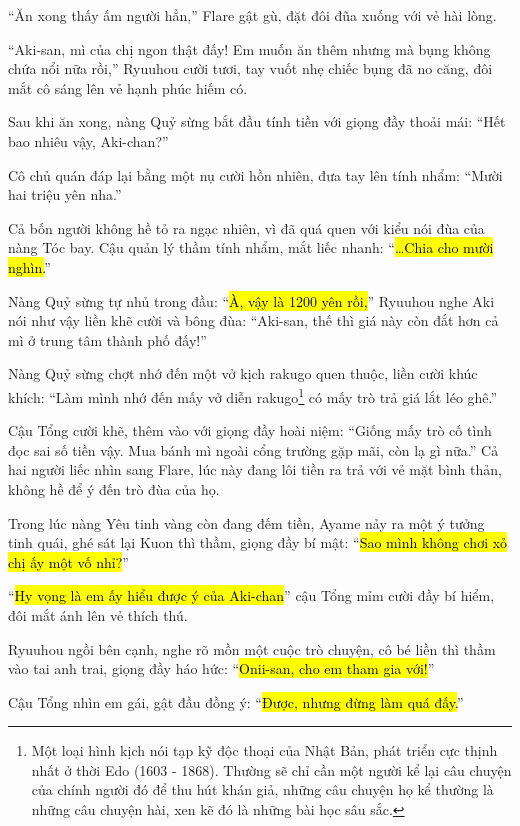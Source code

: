 \documentclass[../main.tex]{subfiles}
\begin{document}
``Ăn xong thấy ấm người hẳn,'' Flare gật gù, đặt đôi đũa xuống với vẻ hài lòng.

``Aki-san, mì của chị ngon thật đấy! Em muốn ăn thêm nhưng mà bụng không chứa nổi nữa rồi,'' Ryuuhou cười tươi, tay vuốt nhẹ chiếc bụng đã no căng, đôi mắt cô sáng lên vẻ hạnh phúc hiếm có.

Sau khi ăn xong, nàng Quỷ sừng bắt đầu tính tiền với giọng đầy thoải mái: ``Hết bao nhiêu vậy, Aki-chan?''

Cô chủ quán đáp lại bằng một nụ cười hồn nhiên, đưa tay lên tính nhẩm: ``Mười hai triệu yên nha.''


Cả bốn người không hề tỏ ra ngạc nhiên, vì đã quá quen với kiểu nói đùa của nàng Tóc bay. Cậu quản lý thầm tính nhẩm, mắt liếc nhanh: ``\hl{\dots Chia cho mười nghìn.}''

Nàng Quỷ sừng tự nhủ trong đầu: ``\hl{À, vậy là 1200 yên rồi,}'' Ryuuhou nghe Aki nói như vậy liền khẽ cười và bông đùa: ``Aki-san, thế thì giá này còn đắt hơn cả mì ở trung tâm thành phố đấy!''

Nàng Quỷ sừng chợt nhớ đến một vở kịch rakugo quen thuộc, liền cười khúc khích: ``Làm mình nhớ đến mấy vở diễn rakugo\footnote{Một loại hình kịch nói tạp kỹ độc thoại của Nhật Bản, phát triển cực thịnh nhất ở thời Edo (1603 - 1868). Thường sẽ chỉ cần một người kể lại câu chuyện của chính người đó để thu hút khán giả, những câu chuyện họ kể thường là những câu chuyện hài, xen kẽ đó là những bài học sâu sắc.} có mấy trò trả giá lắt léo ghê.''

Cậu Tổng cười khẽ, thêm vào với giọng đầy hoài niệm: ``Giống mấy trò cố tình đọc sai số tiền vậy. Mua bánh mì ngoài cổng trường gặp mãi, còn lạ gì nữa.'' Cả hai người liếc nhìn sang Flare, lúc này đang lôi tiền ra trả với vẻ mặt bình thản, không hề để ý đến trò đùa của họ.

Trong lúc nàng Yêu tinh vàng còn đang đếm tiền, Ayame nảy ra một ý tưởng tinh quái, ghé sát lại Kuon thì thầm, giọng đầy bí mật: ``\hl{Sao mình không chơi xỏ chị ấy một vố nhỉ?}''

``\hl{Hy vọng là em ấy hiểu được ý của Aki-chan}'' cậu Tổng mỉm cười đầy bí hiểm, đôi mắt ánh lên vẻ thích thú.

Ryuuhou ngồi bên cạnh, nghe rõ mồn một cuộc trò chuyện, cô bé liền thì thầm vào tai anh trai, giọng đầy háo hức: ``\hl{Onii-san, cho em tham gia với!}''

Cậu Tổng nhìn em gái, gật đầu đồng ý: ``\hl{Được, nhưng đừng làm quá đấy.}''
\end{document}
